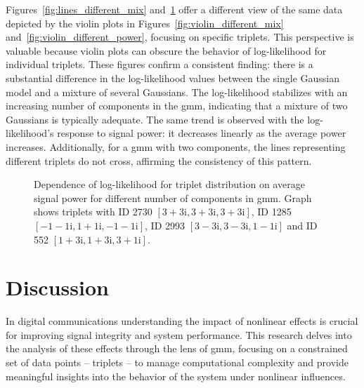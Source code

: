 Figures~\ref{fig:lines_different_mix} and~\ref{fig:loglik_for_triplets} offer a different view of the same data depicted by the violin plots in Figures~\ref{fig:violin_different_mix} and~\ref{fig:violin_different_power}, focusing on specific triplets. This perspective is valuable because violin plots can obscure the behavior of log-likelihood for individual triplets. These figures confirm a consistent finding: there is a substantial difference in the log-likelihood values between the single Gaussian model and a mixture of several Gaussians. The log-likelihood stabilizes with an increasing number of components in the \gls{gmm}, indicating that a mixture of two Gaussians is typically adequate. The same trend is observed with the log-likelihood's response to signal power: it decreases linearly as the average power increases. Additionally, for a \gls{gmm} with two components, the lines representing different triplets do not cross, affirming the consistency of this pattern.


\begin{figure}[htpb]
    \caption{Dependence of log-likelihood for triplet distribution on average signal power for different number of components in \gls{gmm}. Graph shows triplets with ID 2730 $[3+3\mathrm{i}, 3+3\mathrm{i}, 3+3\mathrm{i}]$, ID 1285 $[-1-1\mathrm{i}, 1+1\mathrm{i}, -1-1\mathrm{i}]$, ID 2993 $[3-3\mathrm{i}, 3-3\mathrm{i}, 1-1\mathrm{i}]$ and ID 552 $[1+3\mathrm{i}, 1+3\mathrm{i}, 3+1\mathrm{i}]$.}
    \label{fig:loglik_for_triplets}
\end{figure}

\section{Discussion}
In digital communications understanding the impact of nonlinear effects is crucial for improving signal integrity and system performance. This research delves into the analysis of these effects through the lens of \acrlong{gmm}, focusing on a constrained set of data points -- triplets -- to manage computational complexity and provide meaningful insights into the behavior of the system under nonlinear influences.

